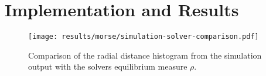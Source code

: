 \chapter{Implementation and Results}
\label{chap:implementation-and-results}



\begin{figure}[H]
  \centering
  \label{fig:simulation-solver-comparison}
  \texttt{[image: results/morse/simulation-solver-comparison.pdf]}
  \caption{Comparison of the radial distance histogram from the simulation output with the solvers equilibrium measure $\rho$.}
\end{figure}
